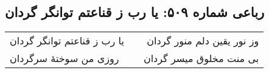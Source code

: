 \begin{center}
\section*{رباعی شماره ۵۰۹: یا رب ز قناعتم توانگر گردان}
\label{sec:sh509}
\begin{longtable}{l p{0.5cm} r}
یا رب ز قناعتم توانگر گردان
&&
وز نور یقین دلم منور گردان
\\
روزی من سوختهٔ سرگردان
&&
بی منت مخلوق میسر گردان
\\
\end{longtable}
\end{center}
